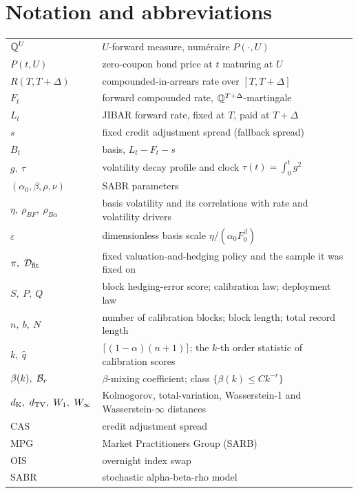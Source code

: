 \chapter*{Notation and abbreviations}
\begin{longtable}{@{}p{}p{}@{}}
$\mathbb{Q}^{U}$ & $U$-forward measure, num\'eraire $P(\cdot,U)$ \\
$P(t,U)$ & zero-coupon bond price at $t$ maturing at $U$ \\
$R(T,T+\Delta)$ & compounded-in-arrears rate over $[T,T+\Delta]$ \\
$F_t$ & forward compounded rate, $\mathbb{Q}^{T+\Delta}$-martingale \\
$L_t$ & JIBAR forward rate, fixed at $T$, paid at $T+\Delta$ \\
$s$ & fixed credit adjustment spread (fallback spread) \\
$B_t$ & basis, $L_t-F_t-s$ \\
$g,\ \tau$ & volatility decay profile and clock $\tau(t)=\int_0^t g^2$ \\
$(\alpha_0,\beta,\rho,\nu)$ & SABR parameters \\
$\eta,\ \rho_{BF},\ \rho_{B\alpha}$ & basis volatility and its correlations with rate and volatility drivers \\
$\varepsilon$ & dimensionless basis scale $\eta/(\alpha_0F_0^\beta)$ \\
$\pi,\ \Dfit$ & fixed valuation-and-hedging policy and the sample it was fixed on \\
$S,\ P,\ Q$ & block hedging-error score; calibration law; deployment law \\
$n,\ b,\ N$ & number of calibration blocks; block length; total record length \\
$k,\ \hat q$ & $\lceil(1-\alpha)(n+1)\rceil$; the $k$-th order statistic of calibration scores \\
$\beta(k),\ \Bclass{r}$ & $\beta$-mixing coefficient; class $\{\beta(k)\le Ck^{-r}\}$ \\
$\dK,\ \dTV,\ \Wone,\ \Winf$ & Kolmogorov, total-variation, Wasserstein-1 and Wasserstein-$\infty$ distances \\
CAS & credit adjustment spread \\
MPG & Market Practitioners Group (SARB) \\
OIS & overnight index swap \\
SABR & stochastic alpha-beta-rho model \\
\end{longtable}
